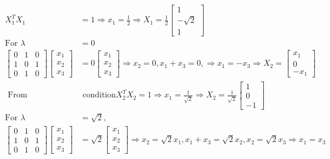\begin{enumerate}
\begin{answer}
\begin{align*}
	X_{1}^{T} X_{1}&=1 \Rightarrow x_{1}=\frac{1}{2} \Rightarrow X_{1}=\frac{1}{2}\left[\begin{array}{c}1 \\ -\sqrt{2} \\ 1\end{array}\right]\\
	\text{For }\lambda&=0\\
	\left[\begin{array}{lll}0 & 1 & 0 \\ 1 & 0 & 1 \\ 0 & 1 & 0\end{array}\right]\left[\begin{array}{l}x_{1} \\ x_{2} \\ x_{3}\end{array}\right]&=0\left[\begin{array}{l}x_{1} \\ x_{2} \\ x_{3}\end{array}\right] \Rightarrow x_{2}=0, x_{1}+x_{3}=0, \Rightarrow x_{1}=-x_{3} \Rightarrow X_{2}=\left[\begin{array}{c}x_{1} \\ 0 \\ -x_{1}\end{array}\right]\\
\text{	From orthogonality }&\text{ condition}X_{2}^{T} X_{2}=1 \Rightarrow x_{1}=\frac{1}{\sqrt{2}} \Rightarrow X_{2}=\frac{1}{\sqrt{2}}\left[\begin{array}{c}1 \\ 0 \\ -1\end{array}\right]\\
\text{For }\lambda&=\sqrt{2},\\
\left[\begin{array}{lll}0 & 1 & 0 \\ 1 & 0 & 1 \\ 0 & 1 & 0\end{array}\right]\left[\begin{array}{l}x_{1} \\ x_{2} \\ x_{3}\end{array}\right]&=\sqrt{2}\left[\begin{array}{l}x_{1} \\ x_{2} \\ x_{3}\end{array}\right] \Rightarrow x_{2}=\sqrt{2} x_{1}, x_{1}+x_{3}=\sqrt{2} x_{2}, x_{2}=\sqrt{2} x_{3} \Rightarrow x_{1}=x_{3}\\

\end{align*}
\end{answer}
\end{enumerate}
